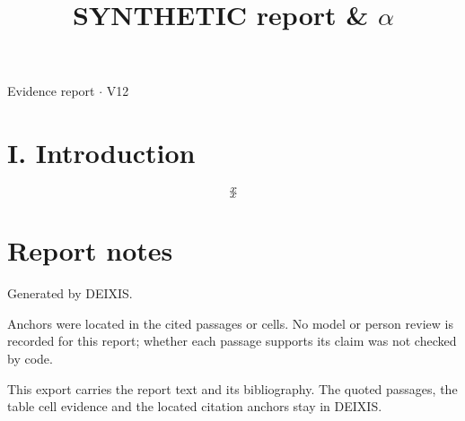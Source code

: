 \documentclass[journal]{IEEEtran}
\begin{document}
\title{SYNTHETIC report \& \ensuremath{\alpha}}

\maketitle

\noindent Evidence report \ensuremath{\cdot} V12

\section*{I. Introduction}

\begin{equation*}
x\tag{z}
\end{equation*}
\cite{Synth26}
\begin{equation}
\label{eq:EQ1}
x
\end{equation}
\cite{Synth26}

\section*{Report notes}

Generated by DEIXIS.

Anchors were located in the cited passages or cells. No model or person review is recorded for this report; whether each passage supports its claim was not checked by code.

This export carries the report text and its bibliography. The quoted passages, the table cell evidence and the located citation anchors stay in DEIXIS.




\end{document}
